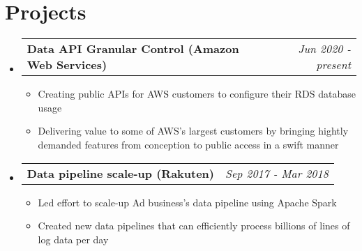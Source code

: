 \documentclass[letterpaper,11pt]{article}
\makeatletter
\newcommand{\bulletItem}[1]{
  \item\small{
    {#1 \vspace{-2pt}}
  }
}
\newcommand{\resumeProject}[2]{
  \vspace{-1pt}\item[]
    \begin{tabular*}{0.97\textwidth}[t]{l@{\extracolsep{\fill}}r}
      \textbf{#1} & \textit{\small #2} \\
    \end{tabular*}\vspace{0pt}
}
\newcommand{\resumeSubHeadingListStart}{\begin{itemize}[leftmargin=0pt]}
\newcommand{\resumeSubHeadingListEnd}{\end{itemize}}
\makeatother
\begin{document}
\section{Projects}

  \resumeSubHeadingListStart
    \resumeProject{Data API Granular Control (Amazon Web Services)}{Jun 2020 - present}
    \begin{itemize} 
      \bulletItem{Creating public APIs for AWS customers to configure their RDS database usage}
      \bulletItem{Delivering value to some of AWS's largest customers by bringing hightly demanded features from conception to public access in a swift manner}
    \end{itemize}

  \resumeProject{Data pipeline scale-up (Rakuten)}{Sep 2017 - Mar 2018}
    \begin{itemize} 
      \bulletItem{Led effort to scale-up Ad business's data pipeline using Apache Spark}
      \bulletItem{Created new data pipelines that can efficiently process billions of lines of log data per day}
    \end{itemize}
  \resumeSubHeadingListEnd
\end{document}
